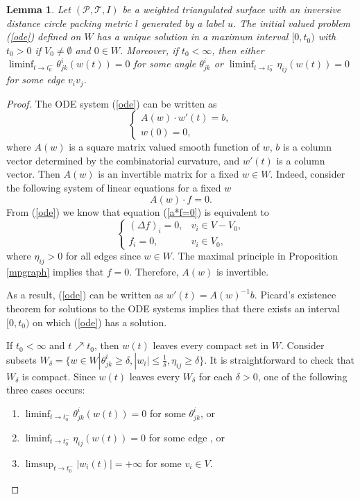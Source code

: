 \documentclass[12pt]{amsart}
\newtheorem{lemma}[theorem]{Lemma}
\begin{document}
\begin{lemma} \label{odeexist} Let $(\mathcal{P}, \mathcal{T}, I)$ be a weighted triangulated surface with an inversive distance circle packing metric $l$ generated by a label $u$. The initial valued problem (\ref{ode})
	defined on $W$ has a unique solution in a maximum interval $[0,	t_0)$ with $t_0>0$ if  $V_0 \neq
	\emptyset$ and $0\in W$. Moreover, if $t_0<\infty$, then either
	$\liminf_{t \to t_0^-} \theta^i_{jk}(w(t)) = 0$ for some angle
	$\theta^i_{jk}$ or $\liminf_{t \to t_0^-} \eta_{ij}(w(t))=0$ for
	some edge $v_iv_j$.
\end{lemma}
\begin{proof}
    The ODE system (\ref{ode}) can be written as
	\begin{equation*} \left\{ {\begin{array}{*{20}{l}}
			{A(w) \cdot w'(t) = b, }\\
			{w(0) = 0,}
	\end{array}} \right. \end{equation*}
    where ${A(w)}$ is a square matrix valued smooth function of $w$, $b$ is a column vector determined by the combinatorial curvature, and ${w'(t)}$ is a column vector. Then ${A(w)}$ is an invertible matrix for a fixed $w\in W$. Indeed, consider the following system of linear equations for a fixed $w$
    \begin{equation} \label{a*f=0} {A(w) \cdot f = 0.}
    \end{equation}
    From (\ref{ode}) we know that equation (\ref{a*f=0}) is equivalent to
    \begin{equation*}   \left\{ {\begin{array}{lr}
    			{{(\Delta f)}_i} = 0,&v_i \in V - {V_0},\\
    			{f_i} = 0,&v_i \in {V_0},
    	\end{array}} \right.
    \end{equation*}
    where ${\eta _{ij}>0}$ for all edges since $w \in W$. The maximal principle in Proposition \ref{mpgraph} implies that ${f = 0}$. Therefore, ${A(w)}$ is invertible.

    As a result, (\ref{ode}) can be written as $w'(t)=A(w)^{-1}b$. Picard's existence theorem for solutions to the ODE systems implies that there exists an interval $[0,{t_0})$ on which  (\ref{ode}) has a solution.

    If $t_0<\infty$ and $t  \nearrow  t_0$, then $w(t)$ leaves every compact set in $W$. Consider subsets $W_{\delta}=\{ w \in W |  \theta^{i}_{jk} \geq \delta,  |w_{i}| \leq \frac{1}{\delta},\eta_{ij} \geq \delta \}$. It is straightforward to check that $W_\delta$ is compact.  Since $w(t)$ leaves every $W_{\delta}$ for each $\delta >0$, one of the following three cases occurs:
    \begin{enumerate}
        \item     $\liminf_{t \to t_0^-} \theta^i_{jk}(w(t))=0$ for some $\theta^i_{jk}$, or
        \item     $\liminf_{t \to t_0^-} \eta_{ij}(w(t))=0$ for some edge , or
        \item     $\limsup_{t \to t_0^-} |w_i(t)|=+\infty$ for some $v_i \in V$.
    \end{enumerate}


\end{proof}
\end{document}
